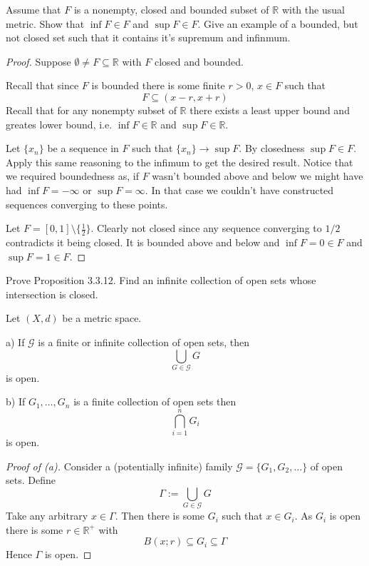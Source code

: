 \begin{prob}
    Assume that $F$ is a nonempty, closed and bounded 
    subset of $\mathbb R$ with the usual metric. Show that 
    $\inf F \in F$ and $\sup F\in F$. Give an example of a 
    bounded, but not closed set such that it contains it's supremum
    and infinmum.
\end{prob}
\begin{proof}
    Suppose $\emptyset \neq F \subseteq \mathbb R$ with 
    $F$ closed and bounded. 

    Recall that since $F$ is bounded there is some finite 
    $r > 0$, $x \in F$ such that 
    \[
        F \subseteq (x-r,x+r)
    \]
    Recall that for any nonempty subset of $\mathbb R$ there 
    exists a least upper bound and greates lower bound, i.e.
    $\inf F \in \mathbb R$ and $\sup F \in \mathbb R$. 

    Let $\{x_n\}$ be a sequence in $F$ such that $\{x_n\} \to \sup F$.
    By closedness $\sup F \in F$. Apply this same reasoning to 
    the infimum to get the desired result. Notice that we required 
    boundedness as, if $F$ wasn't bounded above and below we 
    might have had $\inf F = -\infty$ or $\sup F = \infty$. In 
    that case we couldn't have constructed sequences converging 
    to these points.

    Let $F = [0,1] \setminus \{\frac{1}{2}\}$. Clearly not closed 
    since any sequence converging to $1/2$ contradicts it being 
    closed. It is bounded above and below and $\inf F = 0 \in F$ 
    and $\sup F = 1 \in F$. 
\end{proof}
\begin{prob}
    Prove Proposition 3.3.12. Find an infinite collection of open 
    sets whose intersection is closed. 
\end{prob}
\begin{prop}
    Let $(X,d)$ be a metric space. 

    a) If $\mathcal G$ is a finite or infinite collection of 
    open sets, then 
    \[
        \bigcup_{G \in \mathcal G}G 
    \]
    is open.

    b) If $G_1, \ldots, G_n$ is a finite collection of open sets 
    then 
    \[
        \bigcap_{i=1}^n G_i
    \]
    is open.
\end{prop}
\begin{proof}[Proof of (a)]
    Consider a (potentially infinite) family 
    $\mathcal G = \{G_1,G_2,\ldots\}$ of open sets. 
    Define 
    \[
        \Gamma := \bigcup_{G \in \mathcal G} G
    \]
    Take any arbitrary $x \in \Gamma$. Then there is some 
    $G_i$ such that $x \in G_i$. 
    As $G_i$ is open there is some $r\in \mathbb R^+$ with 
    \[
        B(x;r) \subseteq G_i \subseteq \Gamma
    \]
    Hence $\Gamma$ is open. 
\end{proof}
